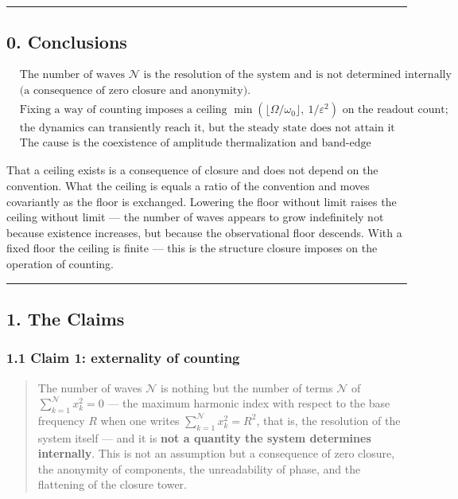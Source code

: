 \documentclass[
  a4paper,
]{article}
\begin{document}
\begin{center}\rule{0.5\linewidth}{0.5pt}\end{center}

\subsection{0. Conclusions}\label{conclusions}

\[
\boxed{
\begin{aligned}
&\text{The number of waves }\mathcal N\text{ is the resolution of the system and is not determined internally}\\
&\text{(a consequence of zero closure and anonymity).}\\
&\text{Fixing a way of counting imposes a ceiling }\min(\lfloor\Omega/\omega_0\rfloor,\ 1/\varepsilon^2)\text{ on the readout count;}\\
&\text{the dynamics can transiently reach it, but the steady state does not attain it and stabilizes below it.}\\
&\text{The cause is the coexistence of amplitude thermalization and band-edge frequency condensation.}
\end{aligned}
}
\]

That a ceiling exists is a consequence of closure and does not depend on
the convention. What the ceiling is equals a ratio of the convention and
moves covariantly as the floor is exchanged. Lowering the floor without
limit raises the ceiling without limit --- the number of waves appears
to grow indefinitely not because existence increases, but because the
observational floor descends. With a fixed floor the ceiling is finite
--- this is the structure closure imposes on the operation of counting.

\begin{center}\rule{0.5\linewidth}{0.5pt}\end{center}

\subsection{1. The Claims}\label{the-claims}

\subsubsection{1.1 Claim 1: externality of
counting}\label{claim-1-externality-of-counting}

\begin{quote}
The number of waves \(\mathcal N\) is nothing but the number of terms
\(\mathcal N\) of \(\sum_{k=1}^{\mathcal N} x_k^2=0\) --- the maximum
harmonic index with respect to the base frequency \(R\) when one writes
\(\sum_{k=1}^{\mathcal N} x_k^2=R^2\), that is, the resolution of the
system itself --- and it is \textbf{not a quantity the system determines
internally}. This is not an assumption but a consequence of zero
closure, the anonymity of components, the unreadability of phase, and
the flattening of the closure tower.
\end{quote}
\end{document}
